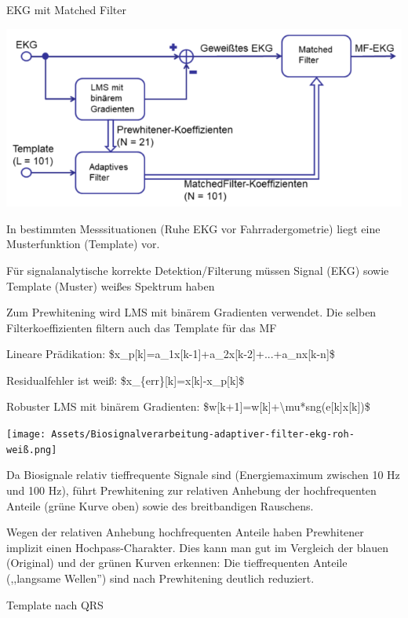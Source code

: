 \documentclass[a4paper]{article}
\begin{document}
\begin{multicols}{3}
  EKG mit Matched Filter

  \begin{itemize*}
    \item \includegraphics[width=.5\linewidth]{Assets/Biosignalverarbeitung-adaptive-filter-match-filter.png}
    \item In bestimmten Messsituationen (Ruhe EKG vor Fahrradergometrie) liegt eine Musterfunktion (Template) vor.
    \item Für signalanalytische korrekte Detektion/Filterung müssen Signal (EKG) sowie Template (Muster) weißes Spektrum haben
    \item Zum Prewhitening wird LMS mit binärem Gradienten verwendet. Die selben Filterkoeffizienten filtern auch das Template für das MF
    \item Lineare Prädikation: \$x\_p{[}k{]}=a\_1x{[}k-1{]}+a\_2x{[}k-2{]}+...+a\_nx{[}k-n{]}\$
    \item Residualfehler ist weiß: \$x\_\{err\}{[}k{]}=x{[}k{]}-x\_p{[}k{]}\$
    \item Robuster LMS mit binärem Gradienten: \$w{[}k+1{]}=w{[}k{]}+\textbackslash mu*sng(e{[}k{]}x{[}k{]})\$
  \end{itemize*}

  \texttt{[image: Assets/Biosignalverarbeitung-adaptiver-filter-ekg-roh-weiß.png]}

  \begin{itemize*}
    \item Da Biosignale relativ tieffrequente Signale sind (Energiemaximum zwischen 10 Hz und 100 Hz), führt Prewhitening zur relativen Anhebung der hochfrequenten Anteile (grüne Kurve oben) sowie des breitbandigen Rauschens.
    \item Wegen der relativen Anhebung hochfrequenten Anteile haben Prewhitener implizit einen Hochpass-Charakter. Dies kann man gut im Vergleich der blauen (Original) und der grünen Kurven erkennen: Die tieffrequenten Anteile (,,langsame Wellen'') sind nach Prewhitening deutlich reduziert.
  \end{itemize*}

  Template nach QRS


\end{multicols}
\end{document}
